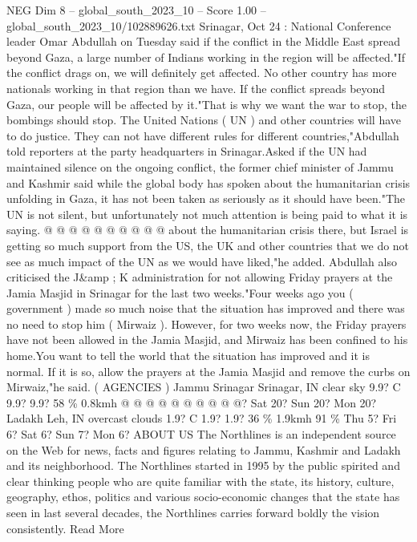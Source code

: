 \begin{textsample}{NEG Dim 8 – global\_south\_2023\_10 – Score 1.00 – global\_south\_2023\_10/102889626.txt}  \label{ex:f8_neg_100}
Srinagar, Oct 24 : National Conference leader Omar Abdullah on Tuesday said if the conflict in the Middle East spread beyond Gaza, a large number of Indians working in the region will be affected."If the conflict drags on, we will definitely get affected.
No other country has more nationals working in that region than we have.
If the conflict spreads beyond Gaza, our people will be affected by it."That is why we want the war to stop, the bombings should stop.
The United Nations ( UN ) and other countries will have to do justice.
They can not have different rules for different countries,"Abdullah told reporters at the party headquarters in Srinagar.Asked if the UN had maintained silence on the ongoing conflict, the former chief minister of Jammu and Kashmir said while the global body has spoken about the humanitarian crisis unfolding in Gaza, it has not been taken as seriously as it should have been."The UN is not silent, but unfortunately not much attention is being paid to what it is saying. @ @ @ @ @ @ @ @ @ @ about the humanitarian crisis there, but Israel is getting so much support from the US, the UK and other countries that we do not see as much impact of the UN as we would have liked,"he added.
Abdullah also criticised the J\&amp ; K administration for not allowing Friday prayers at the Jamia Masjid in Srinagar for the last two weeks."Four weeks ago you ( government ) made so much noise that the situation has improved and there was no need to stop him ( Mirwaiz ).
However, for two weeks now, the Friday prayers have not been allowed in the Jamia Masjid, and Mirwaiz has been confined to his home.You want to tell the world that the situation has improved and it is normal.
If it is so, allow the prayers at the Jamia Masjid and remove the curbs on Mirwaiz,"he said. ( AGENCIES ) Jammu Srinagar Srinagar, IN clear sky 9.9?
C 9.9? 9.9? 58 \% 0.8kmh @ @ @ @ @ @ @ @ @ @?
Sat 20?
Sun 20?
Mon 20?
Ladakh Leh, IN overcast clouds 1.9?
C 1.9? 1.9? 36 \% 1.9kmh 91 \% Thu 5?
Fri 6?
Sat 6?
Sun 7?
Mon 6?
ABOUT US The Northlines is an independent source on the Web for news, facts and figures relating to Jammu, Kashmir and Ladakh and its neighborhood.
The Northlines started in 1995 by the public spirited and clear thinking people who are quite familiar with the state, its history, culture, geography, ethos, politics and various socio-economic changes that the state has seen in last several decades, the Northlines carries forward boldly the vision consistently.
Read More

\end{textsample}
